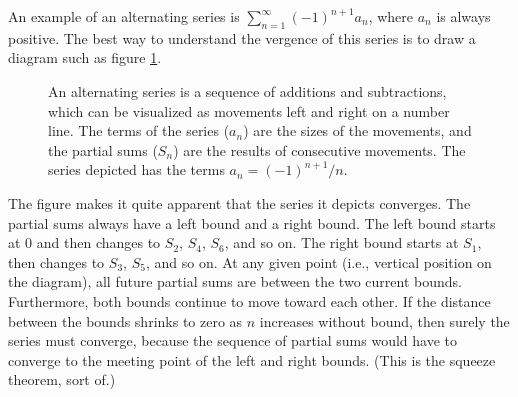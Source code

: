 \documentclass{myarticle}
\theoremstyle{nospace}
\newtheorem{old series theorem}{Theorem}
\newenvironment{series theorem}{\begin{mdframed}\begin{old series theorem}}{\end{old series theorem}\end{mdframed}}
\begin{document}
An example of an alternating series is $\sum_{n=1}^\infty (-1)^{n+1} a_n$, where $a_n$ is always positive. The best way to understand the vergence of this series is to draw a diagram such as figure \ref{fig:alternating series}.

\begin{figure}[htb!] \centering
{}
\caption{An alternating series is a sequence of additions and subtractions, which can be visualized as movements left and right on a number line. The terms of the series ($a_n$) are the sizes of the movements, and the partial sums ($S_n$) are the results of consecutive movements. The series depicted has the terms $a_n = (-1)^{n+1}/n$.}
\label{fig:alternating series}
\end{figure}

The figure makes it quite apparent that the series it depicts converges. The partial sums always have a left bound and a right bound. The left bound starts at $0$ and then changes to $S_2$, $S_4$, $S_6$, and so on. The right bound starts at $S_1$, then changes to $S_3$, $S_5$, and so on. At any given point (i.e., vertical position on the diagram), all future partial sums are between the two current bounds. Furthermore, both bounds continue to move toward each other. If the distance between the bounds shrinks to zero as $n$ increases without bound, then surely the series must converge, because the sequence of partial sums would have to converge to the meeting point of the left and right bounds. (This is the squeeze theorem, sort of.)
\end{document}
